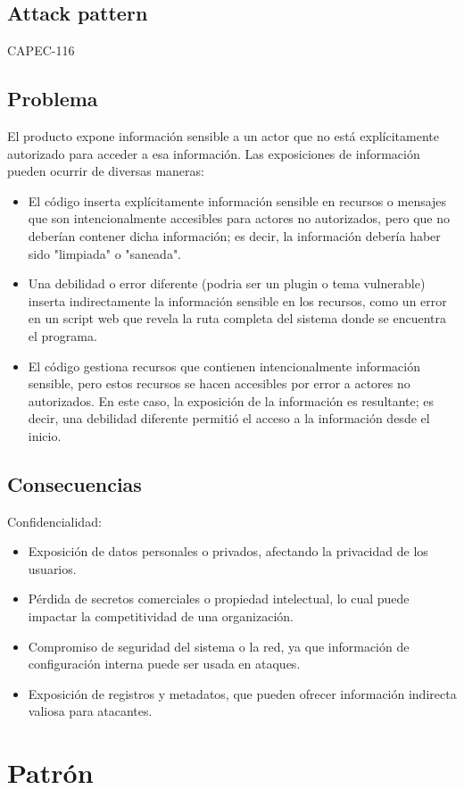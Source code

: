 \subsection{Attack pattern}
CAPEC-116
\subsection{Problema}
El producto expone información sensible a un actor que no está explícitamente autorizado para acceder a esa información. Las exposiciones de información pueden ocurrir de diversas maneras:
    \begin{itemize}
        \item El código inserta explícitamente información sensible en recursos o mensajes que son intencionalmente accesibles para actores no autorizados, pero que no deberían contener dicha información; es decir, la información debería haber sido "limpiada" o "saneada".
        \item Una debilidad o error diferente (podria ser un plugin o tema vulnerable) inserta indirectamente la información sensible en los recursos, como un error en un script web que revela la ruta completa del sistema donde se encuentra el programa.
        \item El código gestiona recursos que contienen intencionalmente información sensible, pero estos recursos se hacen accesibles por error a actores no autorizados. En este caso, la exposición de la información es resultante; es decir, una debilidad diferente permitió el acceso a la información desde el inicio.
    \end{itemize}
\subsection{Consecuencias}
Confidencialidad:
\begin{itemize}
    \item Exposición de datos personales o privados, afectando la privacidad de los usuarios.
    \item Pérdida de secretos comerciales o propiedad intelectual, lo cual puede impactar la competitividad de una organización.
    \item Compromiso de seguridad del sistema o la red, ya que información de configuración interna puede ser usada en ataques.
    \item Exposición de registros y metadatos, que pueden ofrecer información indirecta valiosa para atacantes.
\end{itemize}
\section{Patrón}

